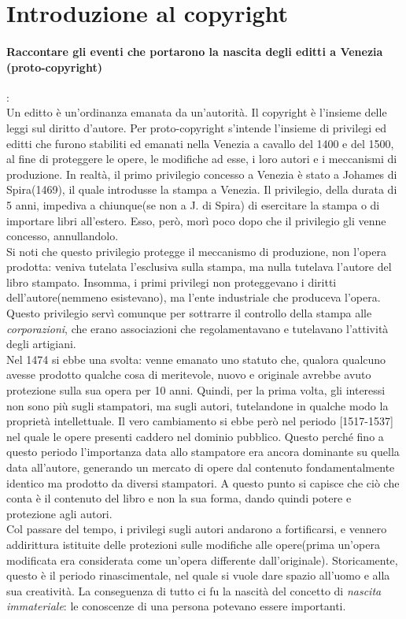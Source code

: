 \documentclass[a4paper]{article}
\begin{document}
	\section{Introduzione al copyright}
	
		\paragraph{Raccontare gli eventi che portarono la nascita degli editti a Venezia (proto-copyright)}:\\
		Un editto è un'ordinanza emanata da un'autorità.
		Il copyright è l'insieme delle leggi sul diritto d'autore.
		Per proto-copyright s'intende l'insieme di privilegi ed editti che furono stabiliti ed emanati nella Venezia a cavallo del 1400 e del 1500, al fine di proteggere le opere, le modifiche ad esse, i loro autori e i meccanismi di produzione.
		In realtà, il primo privilegio concesso a Venezia è stato a Johames di Spira(1469), il quale introdusse la stampa a Venezia. Il privilegio, della durata di 5 anni, impediva a chiunque(se non a J. di Spira) di esercitare la stampa o di importare libri all'estero. Esso, però, morì poco dopo che il privilegio gli venne concesso, annullandolo. \\
		Si noti che questo privilegio protegge il meccanismo di produzione, non l'opera prodotta: veniva tutelata l'esclusiva sulla stampa, ma nulla tutelava l'autore del libro stampato.
		Insomma, i primi privilegi non proteggevano i diritti dell'autore(nemmeno esistevano), ma l'ente industriale che produceva l'opera.
		Questo privilegio servì comunque per sottrarre il controllo della stampa alle \textit{corporazioni}, che erano associazioni che regolamentavano e tutelavano l'attività degli artigiani.\\
		Nel 1474 si ebbe una svolta: venne emanato uno statuto che, qualora qualcuno avesse prodotto qualche cosa di meritevole, nuovo e originale avrebbe avuto protezione sulla sua opera per 10 anni. Quindi, per la prima volta, gli interessi non sono più sugli stampatori, ma sugli autori, tutelandone in qualche modo la proprietà intellettuale.
		Il vero cambiamento si ebbe però nel periodo [1517-1537] nel quale le opere presenti caddero nel dominio pubblico. Questo perché fino a questo periodo l'importanza data allo stampatore era ancora dominante su quella data all'autore, generando un mercato di opere dal contenuto fondamentalmente identico ma prodotto da diversi stampatori. A questo punto si capisce che ciò che conta è il contenuto del libro e non la sua forma, dando quindi potere e protezione agli autori.\\
		Col passare del tempo, i privilegi sugli autori andarono a fortificarsi, e vennero addirittura istituite delle protezioni sulle modifiche alle opere(prima un'opera modificata era considerata come un'opera differente dall'originale).
		Storicamente, questo è il periodo rinascimentale, nel quale si vuole dare spazio all'uomo e alla sua creatività.
		La conseguenza di tutto ci fu la nascità del concetto di \textit{nascita immateriale}: le conoscenze di una persona potevano essere importanti.
		
\end{document}

